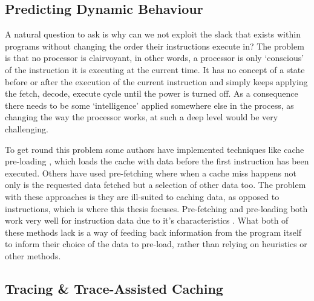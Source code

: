 \subsection{Predicting Dynamic Behaviour}

A natural question to ask is why can we not exploit the slack that exists within programs without changing the order their instructions execute in? The problem is that no processor is clairvoyant, in other words, a processor is only `conscious' of the instruction it is executing at the current time. It has no concept of a state before or after the execution of the current instruction and simply keeps applying the fetch, decode, execute cycle until the power is turned off. As a consequence there needs to be some `intelligence' applied somewhere else in the process, as changing the way the processor works, at such a deep level would be very challenging.

To get round this problem some authors have implemented techniques like cache pre-loading \cite{ozawaCacheMissHeuristics1995}, which loads the cache with data before the first instruction has been executed. Others have used pre-fetching \cite{garsideRealtimePrefetchingSharedmemory2015} where when a cache miss happens not only is the requested data fetched but a selection of other data too. The problem with these approaches is they are ill-suited to caching data, as opposed to instructions, which is where this thesis focuses. Pre-fetching and pre-loading both work very well for instruction data due to it's characteristics \cite{leeWhenPrefetchingWorks2012, smithCacheMemories1982}. What both of these methods lack is a way of feeding back information from the program itself to inform their choice of the data to pre-load, rather than relying on heuristics or other methods.


\subsection{Tracing \& Trace-Assisted Caching}

